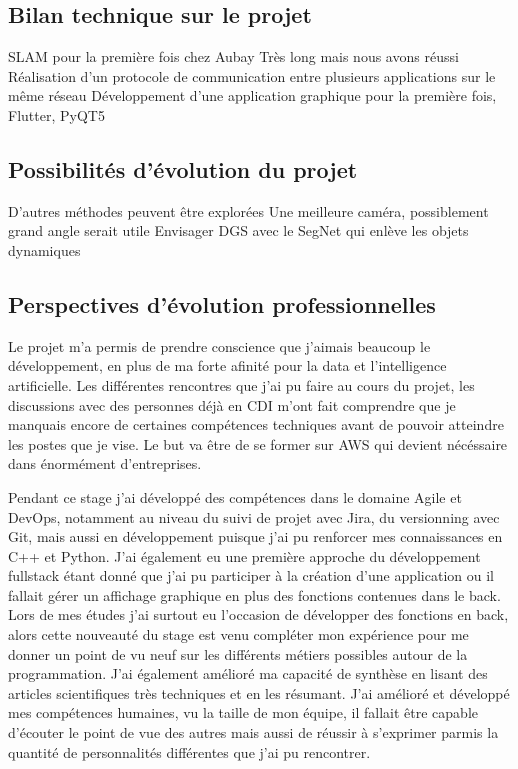 \documentclass[11pt]{article}
\begin{document}
  \subsection{Bilan technique sur le projet}
    SLAM pour la première fois chez Aubay
    Très long mais nous avons réussi
    Réalisation d'un protocole de communication entre plusieurs applications sur le même réseau 
    Développement d'une application graphique pour la première fois, Flutter, PyQT5

  \subsection{Possibilités d'évolution du projet}
    D'autres méthodes peuvent être explorées
    Une meilleure caméra, possiblement grand angle serait utile
    Envisager DGS avec le SegNet qui enlève les objets dynamiques

  \subsection{Perspectives d'évolution professionnelles}
   Le projet m'a permis de prendre conscience que j'aimais beaucoup le développement, en plus de ma forte 
   afinité pour la data et l'intelligence artificielle. Les différentes rencontres que j'ai pu faire au 
   cours du projet, les discussions avec des personnes déjà en CDI m'ont fait comprendre que je manquais
   encore de certaines compétences techniques avant de pouvoir atteindre les postes que je vise.
   Le but va être de se former sur AWS qui devient nécéssaire dans énormément d'entreprises.

   Pendant ce stage j'ai développé des compétences dans le domaine Agile et DevOps, notamment au niveau du 
   suivi de projet avec Jira, du versionning avec Git, mais aussi en développement puisque j'ai pu renforcer 
   mes connaissances en C++ et Python. J'ai également eu une première approche du développement fullstack 
   étant donné que j'ai pu participer à la création d'une application ou il fallait gérer un affichage 
   graphique en plus des fonctions contenues dans le back. Lors de mes études j'ai surtout eu l'occasion de 
   développer des fonctions en back, alors cette nouveauté du stage est venu compléter mon expérience pour me 
   donner un point de vu neuf sur les différents métiers possibles autour de la programmation.
   J'ai également amélioré ma capacité de synthèse en lisant des articles scientifiques très techniques et en 
   les résumant.
   J'ai amélioré et développé mes compétences humaines, vu la taille de mon équipe, il fallait être capable 
   d'écouter le point de vue des autres mais aussi de réussir à s'exprimer parmis la quantité de personnalités 
   différentes que j'ai pu rencontrer.
\end{document}
